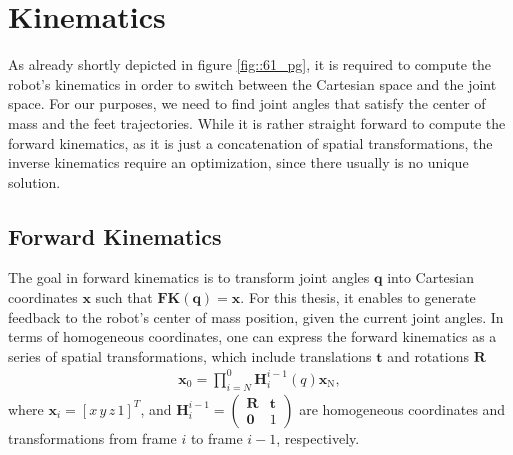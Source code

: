 \FloatBarrier
\section{Kinematics}
\label{sec::24_k}
As already shortly depicted in figure \ref{fig::61_pg}, it is required to compute the robot's kinematics in order to switch between the Cartesian space and the joint space. For our purposes, we need to find joint angles that satisfy the center of mass and the feet trajectories. While it is rather straight forward to compute the forward kinematics, as it is just a concatenation of spatial transformations, the inverse kinematics require an optimization, since there usually is no unique solution.
\FloatBarrier
\subsection{Forward Kinematics}
\label{sec::241_fk}
The goal in forward kinematics is to transform joint angles $\bm{q}$ into Cartesian coordinates $\bm{x}$ such that $\textbf{FK}(\bm{q}) = \bm{x}$. For this thesis, it enables to generate feedback to the robot's center of mass position, given the current joint angles. In terms of homogeneous coordinates, one can express the forward kinematics as a series of spatial transformations, which include translations $\bm{t}$ and rotations $\bm{R}$ 
\begin{align}
	\bm{x}_\text{0} = \prod_{i=N}^{0}\bm{H}_i^{i-1}(q)\bm{x}_\text{N},
\end{align}
where $\bm{x}_i=[x\,y\,z\,1]^T$, and $\bm{H}_i^{i-1}=\begin{pmatrix}\bm{R} & \bm{t} \\ \bm{0} & 1 \end{pmatrix}$ are homogeneous coordinates and transformations from frame $i$ to frame $i-1$, respectively.
\FloatBarrier
